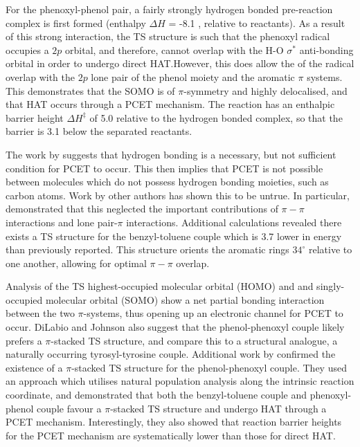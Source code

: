 For the phenoxyl-phenol pair, a fairly strongly hydrogen bonded pre-reaction complex is first formed (enthalpy $\Delta H$ = -8.1 \kcalmol, relative to reactants). As a result of this strong interaction, the TS structure is such that the phenoxyl radical occupies a $2p$ orbital, and therefore, cannot overlap with the H-O $\sigma^*$ anti-bonding orbital in order to undergo direct HAT.\@ However, this does allow the of the radical overlap with the $2p$ lone pair of the phenol moiety and the aromatic $\pi$ systems. This demonstrates that the SOMO is of $\pi$-symmetry and highly delocalised, and that HAT occurs through a PCET mechanism. The reaction has an enthalpic barrier height $\Delta H^{\ddagger}$ of 5.0 \kcalmol relative to the hydrogen bonded complex, so that the barrier is 3.1 \kcalmol below the separated reactants.

The work by \citet{Mayer2002} suggests that hydrogen bonding is a necessary, but not sufficient condition for PCET to occur. This then implies that PCET is not possible between molecules which do not possess hydrogen bonding moieties, such as carbon atoms. Work by other authors has shown this to be untrue.\cite{Hatcher2007, DiLabio2007} In particular, \citet{DiLabio2007} demonstrated that this neglected the important contributions of $\pi-\pi$ interactions and lone pair-$\pi$ interactions. Additional calculations revealed there exists a TS structure for the benzyl-toluene couple which is 3.7 \kcalmol lower in energy than previously reported. This structure orients the aromatic rings $34^\circ$ relative to one another, allowing for optimal $\pi-\pi$ overlap.

Analysis of the TS highest-occupied molecular orbital (HOMO) and and singly-occupied molecular orbital (SOMO) show a net partial bonding interaction between the two $\pi$-systems, thus opening up an electronic channel for PCET to occur. DiLabio and Johnson also suggest that the phenol-phenoxyl couple likely prefers a $\pi$-stacked TS structure, and compare this to a structural analogue, a naturally occurring tyrosyl-tyrosine couple. Additional work by \citet{MunozRugeles2017} confirmed the existence of a $\pi$-stacked TS structure for the phenol-phenoxyl couple. They used an approach which utilises natural population analysis along the intrinsic reaction coordinate, and demonstrated that both the benzyl-toluene couple and phenoxyl-phenol couple favour a $\pi$-stacked TS structure and undergo HAT through a PCET mechanism. Interestingly, they also showed that reaction barrier heights for the PCET mechanism are systematically lower than those for direct HAT.\@

